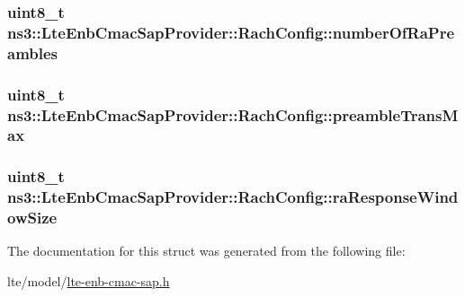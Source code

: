 \subsubsection[{\texorpdfstring{number\+Of\+Ra\+Preambles}{numberOfRaPreambles}}]{\setlength{\rightskip}{0pt plus 5cm}uint8\+\_\+t ns3\+::\+Lte\+Enb\+Cmac\+Sap\+Provider\+::\+Rach\+Config\+::number\+Of\+Ra\+Preambles}\hypertarget{structns3_1_1LteEnbCmacSapProvider_1_1RachConfig_aaf2f9cefb4961854d40da9b4321d5c8d}{}\label{structns3_1_1LteEnbCmacSapProvider_1_1RachConfig_aaf2f9cefb4961854d40da9b4321d5c8d}
\subsubsection[{\texorpdfstring{preamble\+Trans\+Max}{preambleTransMax}}]{\setlength{\rightskip}{0pt plus 5cm}uint8\+\_\+t ns3\+::\+Lte\+Enb\+Cmac\+Sap\+Provider\+::\+Rach\+Config\+::preamble\+Trans\+Max}\hypertarget{structns3_1_1LteEnbCmacSapProvider_1_1RachConfig_a0bb12f70e5459de4c06213a81eb4eef9}{}\label{structns3_1_1LteEnbCmacSapProvider_1_1RachConfig_a0bb12f70e5459de4c06213a81eb4eef9}
\subsubsection[{\texorpdfstring{ra\+Response\+Window\+Size}{raResponseWindowSize}}]{\setlength{\rightskip}{0pt plus 5cm}uint8\+\_\+t ns3\+::\+Lte\+Enb\+Cmac\+Sap\+Provider\+::\+Rach\+Config\+::ra\+Response\+Window\+Size}\hypertarget{structns3_1_1LteEnbCmacSapProvider_1_1RachConfig_a8b2cadac9946eb9a8cffdbdc0d9840da}{}\label{structns3_1_1LteEnbCmacSapProvider_1_1RachConfig_a8b2cadac9946eb9a8cffdbdc0d9840da}


The documentation for this struct was generated from the following file\+:\begin{DoxyCompactItemize}
\item 
lte/model/\hyperlink{lte-enb-cmac-sap_8h}{lte-\/enb-\/cmac-\/sap.\+h}\end{DoxyCompactItemize}
